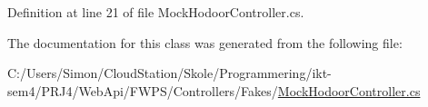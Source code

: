 Definition at line 21 of file Mock\+Hodoor\+Controller.\+cs.



The documentation for this class was generated from the following file\+:\begin{DoxyCompactItemize}
\item 
C\+:/\+Users/\+Simon/\+Cloud\+Station/\+Skole/\+Programmering/ikt-\/sem4/\+P\+R\+J4/\+Web\+Api/\+F\+W\+P\+S/\+Controllers/\+Fakes/\mbox{\hyperlink{_mock_hodoor_controller_8cs}{Mock\+Hodoor\+Controller.\+cs}}\end{DoxyCompactItemize}
